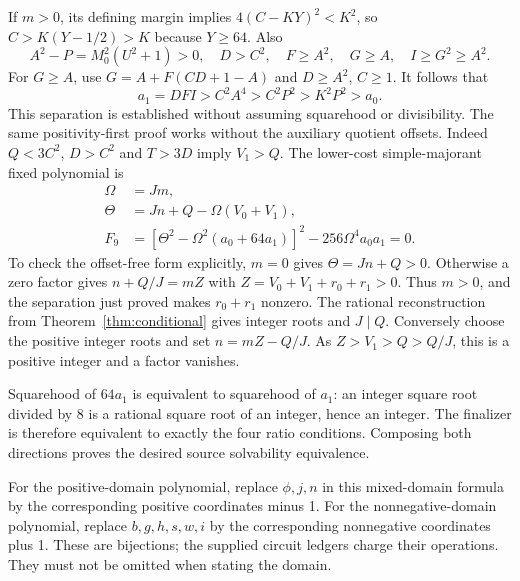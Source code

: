 If $m>0$, its defining margin implies $4(C-KY)^2<K^2$, so
$C>K(Y-1/2)>K$ because $Y\ge64$. Also
\[
 A^2-P=M_0^2(U^2+1)>0,\quad D>C^2,\quad F\ge A^2,\quad
 G\ge A,\quad I\ge G^2\ge A^2.
\]
For $G\ge A$, use $G=A+F(CD+1-A)$ and $D\ge A^2$, $C\ge1$.
It follows that
\[
 a_1=DFI>C^2A^4>C^2P^2>K^2P^2>a_0.
\]
This separation is established without assuming squarehood or divisibility.
The same positivity-first proof works without the auxiliary quotient offsets.
Indeed $Q<3C^2$, $D>C^2$ and $T>3D$ imply $V_1>Q$.
The lower-cost simple-majorant fixed polynomial is
\begin{align*}
 \Omega&=Jm,\\
 \Theta&=Jn+Q-\Omega(V_0+V_1),\\
 F_9&=[\Theta^2-\Omega^2(a_0+64a_1)]^2
                   -256\Omega^4a_0a_1=0.
\end{align*}
To check the offset-free form explicitly, $m=0$ gives $\Theta=Jn+Q>0$.
Otherwise a zero factor gives $n+Q/J=mZ$ with
$Z=V_0+V_1+r_0+r_1>0$. Thus $m>0$, and the separation just proved
makes $r_0+r_1$ nonzero. The rational reconstruction from
Theorem~\ref{thm:conditional} gives integer roots and $J\mid Q$.
Conversely choose the positive integer roots and set $n=mZ-Q/J$.
As $Z>V_1>Q>Q/J$, this is a positive integer and a factor vanishes.

Squarehood of $64a_1$ is equivalent to squarehood of $a_1$: an integer
square root divided by 8 is a rational square root of an integer, hence
an integer. The finalizer is therefore equivalent to exactly the four
ratio conditions. Composing both directions proves the desired source
solvability equivalence.

For the positive-domain polynomial, replace $\phi,j,n$ in this mixed-domain
formula by the corresponding positive coordinates minus 1. For the
nonnegative-domain polynomial, replace $b,g,h,s,w,i$ by the corresponding
nonnegative coordinates plus 1. These are bijections; the supplied circuit
ledgers charge their operations. They must not be omitted when stating the
domain.

